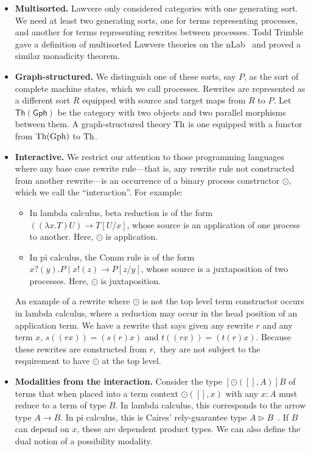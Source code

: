 \documentclass{article}
\begin{document}
\begin{itemize}
    \item {\bf Multisorted.}  Lawvere only considered categories with one generating sort. We need at least two generating sorts, one for terms representing processes, and another for terms representing rewrites between processes. Todd Trimble gave a definition of multisorted Lawvere theories on the nLab~\cite{Trimble2018} and proved a similar monadicity theorem.

    \item {\bf Graph-structured.}  We distinguish one of these sorts, say $P$, as the sort of complete machine states, which we call processes. Rewrites are represented as a different sort $R$ equipped with source and target maps from $R$ to $P$. Let $\mathsf{Th(Gph)}$ be the category with two objects and two parallel morphisms between them. A graph-structured theory ${\rm Th}$ is one equipped with a functor from ${\rm Th}({\rm Gph})$ to ${\rm Th}$.

    \item {\bf Interactive.}  We restrict our attention to those programming languages where any base case rewrite rule---that is, any rewrite rule not constructed from another rewrite---is an occurrence of a binary process constructor $\odot,$ which we call the ``interaction''.  For example:

\begin{itemize}
    \item In lambda calculus, beta reduction is of the form $((\lambda x.T) U) \to T[U/x]$, whose source is an application of one process to another.  Here, $\odot$ is application.
    \item In pi calculus, the Comm rule is of the form $x?(y).P \mid x!(z) \to P[z/y]$, whose source is a juxtaposition of two processes.  Here, $\odot$ is juxtaposition.
\end{itemize}

An example of a rewrite where $\odot$ is not the top level term constructor occurs in lambda calculus, where a reduction may occur in the head position of an application term.  We have a rewrite that says given any rewrite $r$ and any term $x$, $s((r x)) = (s(r) x)$ and $t((r x)) = (t(r) x).$  Because these rewrites are constructed from $r,$ they are not subject to the requirement to have $\odot$ at the top level.

    \item {\bf Modalities from the interaction.}  Consider the type $[\odot([], A)] B$ of terms that when placed into a term context $\odot([], x)$ with any $x\colon A$ must reduce to a term of type $B$. In lambda calculus, this corresponds to the arrow type $A \to B$. In pi calculus, this is Caires' rely-guarantee type $A \triangleright B$~\cite{Caires2007}.  If $B$ can depend on $x$, these are dependent product types.  We can also define the dual notion of a possibility modality.


\end{itemize}
\end{document}
